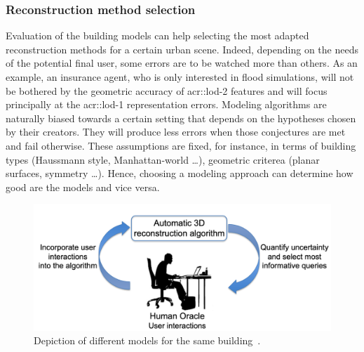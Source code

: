         \subsubsection{Reconstruction method selection}
            Evaluation of the building models can help selecting the most adapted reconstruction methods for a certain urban scene.
            Indeed, depending on the needs of the potential final user, some errors are to be watched more than others.
            As an example, an insurance agent, who is only interested in flood simulations, will not be bothered by the geometric accuracy of \gls{acr::lod}-2 features and will focus principally at the \gls{acr::lod}-1 representation errors.
            Modeling algorithms are naturally biased towards a certain setting that depends on the hypotheses chosen by their creators.
            They will produce less errors when those conjectures are met and fail otherwise.
            These assumptions are fixed, for instance, in terms of building types (Haussmann style, Manhattan-world \dots), geometric criterea (planar surfaces, symmetry \dots).
            Hence, choosing a modeling approach can determine how good are the models and vice versa.
            \begin{figure}[H]
                \centering
                \includegraphics[width=\textwidth]{images/introduction/use/active_learning_kowdle}
                \caption{\label{fig::comparison} Depiction of different models for the same building~\parencite{li2016manhattan}.}
            \end{figure}

